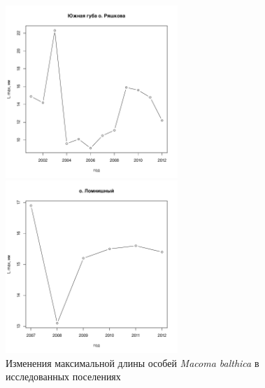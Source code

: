 \documentclass[12pt, a4paper]{article}
\begin{document}
\begin{figure}[h]
\begin{minipage}[b]{.46\linewidth}
\begin{center}
\includegraphics[width=65mm]{../White_Sea/Ryashkov_YuG/L_max.pdf}
\end{center}
\end{minipage}
%
\hfil %
%
\begin{minipage}[b]{.46\linewidth}
\begin{center}
\includegraphics[width=65mm]{../White_Sea/Lomnishniy/L_max.pdf}
\end{center}
\end{minipage}



\caption{Изменения максимальной длины особей {\it Macoma balthica} в исследованных поселениях}
\label{ris:Length_max}
\end{figure}
\end{document}
